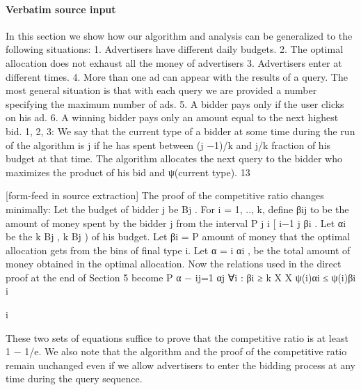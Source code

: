 \documentclass[10pt]{article}
\begin{document}
\paragraph{Verbatim source input}
\begin{ReviewVerbatim}
In this section we show how our algorithm and analysis can be generalized to the following
situations:
1. Advertisers have different daily budgets.
2. The optimal allocation does not exhaust all the money of advertisers
3. Advertisers enter at different times.
4. More than one ad can appear with the results of a query. The most general situation is
that with each query we are provided a number specifying the maximum number of ads.
5. A bidder pays only if the user clicks on his ad.
6. A winning bidder pays only an amount equal to the next highest bid.
1, 2, 3: We say that the current type of a bidder at some time during the run of the algorithm
is j if he has spent between (j −1)/k and j/k fraction of his budget at that time. The algorithm
allocates the next query to the bidder who maximizes the product of his bid and ψ(current
type).
13


[form-feed in source extraction]
The proof of the competitive ratio changes minimally: Let the budget of bidder j be Bj . For
i = 1, .., k, define βij to be the amount of money spent by the bidder j from the interval
P j
i
[ i−1
j βi . Let αi be the
k Bj , k Bj ) of his budget. Let βi =
P amount of money that the optimal
allocation gets from the bins of final type i. Let α = i αi , be the total amount of money
obtained in the optimal allocation.
Now the relations used in the direct proof at the end of Section 5 become
P
α − ij=1 αj
∀i : βi ≥
k
X
X
ψ(i)αi ≤
ψ(i)βi
i

i

These two sets of equations suffice to prove that the competitive ratio is at least 1 − 1/e. We
also note that the algorithm and the proof of the competitive ratio remain unchanged even if
we allow advertisers to enter the bidding process at any time during the query sequence.
\end{ReviewVerbatim}
\end{document}
